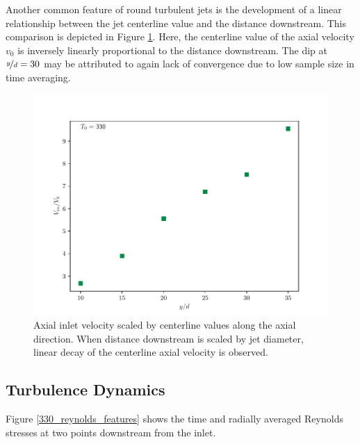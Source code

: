 Another common feature of round turbulent jets is the development of a linear relationship between the jet centerline value and the distance downstream. This comparison is depicted in Figure \ref{330_centerline_scaling}. Here, the centerline value of the axial velocity $v_0$ is inversely linearly proportional to the distance downstream. The dip at $\nicefrac{y}{d}=30$ may be attributed to again lack of convergence due to low sample size in time averaging. 

\begin{figure}[H]
\begin{center}
	\includegraphics[scale=.7]{figures/Plots/radial/slices_5/same_ambient/uin_u0_vs_x_d.pdf}
	\caption{Axial inlet velocity scaled by centerline values along the axial direction. When distance downstream is scaled by jet diameter, linear decay of the centerline axial velocity is observed.} \label{330_centerline_scaling}
\end{center}
\end{figure}

\subsection{Turbulence Dynamics}
Figure \ref{330_reynolds_features} shows the time and radially averaged Reynolds stresses at two points downstream from the inlet. 

